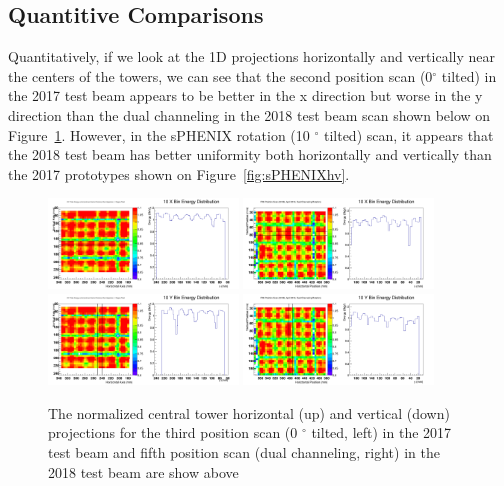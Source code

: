 \documentclass[hidelinks,11pt]{article}
\numberwithin{figure}{section}
\numberwithin{table}{section}
\newcommand{\degree}{\mbox{$^\circ$}\xspace}
\begin{document}
\subsection{Quantitive Comparisons}


Quantitatively, if we look at the 1D projections horizontally and vertically near the centers of the towers, we can see that the second position scan (0\degree tilted) in the 2017 test beam appears to be better in the x direction but worse in the y direction than the dual channeling in the 2018 test beam scan shown below on Figure~\ref{fig:dualhv}. However, in the sPHENIX rotation (10 \degree tilted) scan, it appears that the 2018 test beam has better uniformity both horizontally and vertically than the 2017 prototypes shown on Figure~\ref{fig:sPHENIXhv}. 

\begin{figure}[hbtp]
\begin{center}
\includegraphics[width=0.45\textwidth]{Plots/2017/3rd/CombY5.png}
\includegraphics[width=0.45\textwidth]{Plots/2018/5th/CombY7.png}
\includegraphics[width=0.45\textwidth]{Plots/2017/3rd/CombX5.png}
\includegraphics[width=0.45\textwidth]{Plots/2018/5th/CombX6.png}
\caption{The normalized central tower horizontal (up) and vertical (down) projections for the third position scan (0 \degree tilted, left) in the 2017 test beam and fifth position scan (dual channeling, right) in the 2018 test beam are show above}
\label{fig:dualhv}
\end{center}
\end{figure} 
\end{document}

